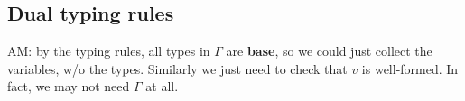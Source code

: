 \subsection{Dual typing rules}
\renewcommand{\Csplit}[2]{#1,  #2}
\renewcommand{\Cupdate}[2]{#1, #2}
\newcommand{\TinV}[2]{{?#1}.#2}
\newcommand{\ToutV}[2]{{!#1}.#2}
\newcommand{\tend}[1]{\mathbf{end}(#1)}

\begin{metanote}
  AM: by the typing rules, all types in $\Gamma$ are \textbf{base}, so we could just collect the variables, w/o the types. Similarly we just need to check that $v$ is well-formed. In fact, we may not need $\Gamma$ at all.
\end{metanote}

